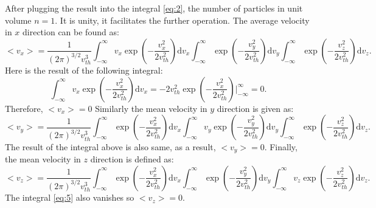 \documentclass[11pt]{amsart}
\begin{document}
After plugging the result into the integral \ref{eq:2}, the number of particles in unit volume $n=1$. It is unity, it facilitates the further operation. The average velocity in $x$ direction can be found as:
\begin{equation}
\label{eq:3}
<v_x>=\frac{1}{(2 \pi)^{3/2}v_{th}^3}\int_{-\infty}^{\infty}v_{x}\exp(-\frac{v_{x}^2}{2 v_{th}^2})\mathrm{d}v_x\int_{-\infty}^{\infty}\exp(-\frac{v_{y}^2}{2 v_{th}^2})\mathrm{d}v_y\int_{-\infty}^{\infty}\exp(-\frac{v_{z}^2}{2 v_{th}^2})\mathrm{d}v_z.
\end{equation}
Here is the result of the following integral:
\begin{equation}
\int_{-\infty}^{\infty}v_{x}\exp(-\frac{v_{x}^2}{2 v_{th}^2})\mathrm{d}v_x=-2v_{th}^2 \exp(-\frac{v_{x}^2}{2 v_{th}^2})\Biggr|_{-\infty}^{\infty}=0.
\end{equation}
Therefore, $<v_x>=0$ Similarly the mean velocity in $y$ direction is given as:
\begin{equation}
\label{eq:4}
<v_y>=\frac{1}{(2 \pi)^{3/2}v_{th}^3}\int_{-\infty}^{\infty}\exp(-\frac{v_{x}^2}{2 v_{th}^2})\mathrm{d}v_x\int_{-\infty}^{\infty}v_{y}\exp(-\frac{v_{y}^2}{2 v_{th}^2})\mathrm{d}v_y\int_{-\infty}^{\infty}\exp(-\frac{v_{z}^2}{2 v_{th}^2})\mathrm{d}v_z.
\end{equation}
The result of the integral above is also same, as a result, $<v_y>=0$. Finally, the mean velocity in $z$ direction is defined as:
\begin{equation}
\label{eq:5}
<v_z>=\frac{1}{(2 \pi)^{3/2}v_{th}^3}\int_{-\infty}^{\infty}\exp(-\frac{v_{x}^2}{2 v_{th}^2})\mathrm{d}v_x\int_{-\infty}^{\infty}\exp(-\frac{v_{y}^2}{2 v_{th}^2})\mathrm{d}v_y\int_{-\infty}^{\infty}v_{z}\exp(-\frac{v_{z}^2}{2 v_{th}^2})\mathrm{d}v_z.
\end{equation}
The integral \ref{eq:5} also vanishes so $<v_z>=0$. 
\end{document}
